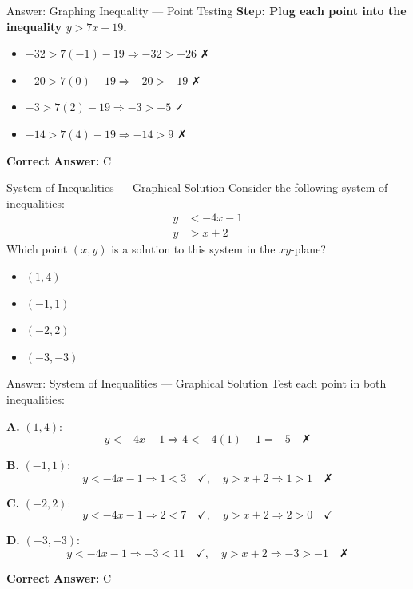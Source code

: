 \documentclass{beamer}
\begin{document}
\begin{frame}{Answer: Graphing Inequality — Point Testing}
    \textbf{Step: Plug each point into the inequality \( y > 7x - 19 \).}

    \begin{itemize}
        \item[\textbf{A.}] \( -32 > 7(-1) - 19 \Rightarrow -32 > -26 \) ✗
        \item[\textbf{B.}] \( -20 > 7(0) - 19 \Rightarrow -20 > -19 \) ✗
        \item[\textbf{C.}] \( -3 > 7(2) - 19 \Rightarrow -3 > -5 \) ✓
        \item[\textbf{D.}] \( -14 > 7(4) - 19 \Rightarrow -14 > 9 \) ✗
    \end{itemize}

    \vspace{0.5em}
    \textbf{Correct Answer:} \(\boxed{\text{C}}\)
\end{frame}



\begin{frame}{System of Inequalities — Graphical Solution}
    Consider the following system of inequalities:
    \[
    \begin{aligned}
    y &< -4x - 1 \\
    y &> x + 2
    \end{aligned}
    \]
    Which point \( (x, y) \) is a solution to this system in the \(xy\)-plane?

    \vspace{1em}
    \begin{itemize}
        \item[\textbf{A.}] \((1, 4)\)
        \item[\textbf{B.}] \((-1, 1)\)
        \item[\textbf{C.}] \((-2, 2)\)
        \item[\textbf{D.}] \((-3, -3)\)
    \end{itemize}
\end{frame}


\begin{frame}{Answer: System of Inequalities — Graphical Solution}
    Test each point in both inequalities:

    \vspace{0.5em}
    \textbf{A.} \( (1, 4) \):  
    \[
    y < -4x - 1 \Rightarrow 4 < -4(1) - 1 = -5 \quad \text{✗}
    \]

    \textbf{B.} \( (-1, 1) \):  
    \[
    y < -4x - 1 \Rightarrow 1 < 3 \quad \text{✓}, \quad y > x + 2 \Rightarrow 1 > 1 \quad \text{✗}
    \]

    \textbf{C.} \( (-2, 2) \):  
    \[
    y < -4x - 1 \Rightarrow 2 < 7 \quad \text{✓}, \quad y > x + 2 \Rightarrow 2 > 0 \quad \text{✓}
    \]

    \textbf{D.} \( (-3, -3) \):  
    \[
    y < -4x - 1 \Rightarrow -3 < 11 \quad \text{✓}, \quad y > x + 2 \Rightarrow -3 > -1 \quad \text{✗}
    \]

    \vspace{0.5em}
    \textbf{Correct Answer:} \(\boxed{\text{C}}\)
\end{frame}
\end{document}
